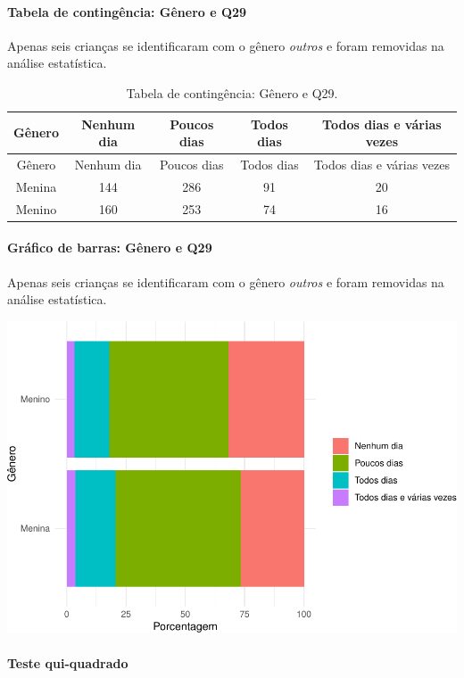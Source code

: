 \documentclass[]{article}
\let\oldparagraph\paragraph
\renewcommand{\paragraph}[1]{\oldparagraph{#1}\mbox{}}
\begin{document}
\cleardoublepage

\hypertarget{tabela-de-continguxeancia-guxeanero-e-q29}{%
\paragraph{Tabela de contingência: Gênero e Q29}\label{tabela-de-continguxeancia-guxeanero-e-q29}}

Apenas seis crianças se identificaram com o gênero \emph{outros} e foram removidas na análise estatística.

\begin{longtable}[]{@{}ccccc@{}}
\caption{\label{tab:unnamed-chunk-907}Tabela de contingência: Gênero e Q29.}\tabularnewline
\toprule
Gênero & Nenhum dia & Poucos dias & Todos dias & Todos dias e várias vezes\tabularnewline
\midrule
\endfirsthead
\toprule
Gênero & Nenhum dia & Poucos dias & Todos dias & Todos dias e várias vezes\tabularnewline
\midrule
\endhead
Menina & 144 & 286 & 91 & 20\tabularnewline
Menino & 160 & 253 & 74 & 16\tabularnewline
\bottomrule
\end{longtable}

\hypertarget{gruxe1fico-de-barras-guxeanero-e-q29}{%
\paragraph{Gráfico de barras: Gênero e Q29}\label{gruxe1fico-de-barras-guxeanero-e-q29}}

Apenas seis crianças se identificaram com o gênero \emph{outros} e foram removidas na análise estatística.

\begin{center}\includegraphics[width=0.75\linewidth]{relatorio_covid19_files/figure-latex/unnamed-chunk-908-1} \end{center}

\hypertarget{teste-qui-quadrado-78}{%
\paragraph{Teste qui-quadrado}\label{teste-qui-quadrado-78}}
\end{document}
